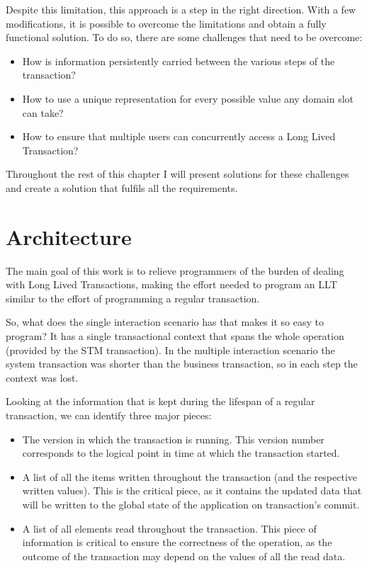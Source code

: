 Despite this limitation, this approach is a step in the right
direction. With a few modifications, it is possible to overcome the
limitations and obtain a fully functional solution. To do so, there
are some challenges that need to be overcome:

\begin{itemize}

\item How is information persistently carried between the various
  steps of the transaction?

\item How to use a unique representation for every possible value any
  domain slot can take?

\item How to ensure that multiple users can concurrently access a Long
  Lived Transaction?

\end{itemize}

Throughout the rest of this chapter I will present solutions for these
challenges and create a solution that fulfils all the requirements.

\section{Architecture}
\label{sec:arch}

The main goal of this work is to relieve programmers of the burden of
dealing with Long Lived Transactions, making the effort needed to
program an LLT similar to the effort of programming a regular
transaction.

So, what does the single interaction scenario has that makes it so
easy to program? It has a single transactional context that spans the
whole operation (provided by the STM transaction). In the multiple
interaction scenario the system transaction was shorter than the
business transaction, so in each step the context was lost.

Looking at the information that is kept during the lifespan of a
regular transaction, we can identify three major pieces:

\begin{itemize}
\item The version in which the transaction is running. This version
  number corresponds to the logical point in time at which the
  transaction started.
\item A list of all the items written throughout the transaction (and
  the respective written values). This is the critical piece, as it
  contains the updated data that will be written to the global state
  of the application on transaction's commit.
\item A list of all elements read throughout the transaction. This
  piece of information is critical to ensure the correctness of the
  operation, as the outcome of the transaction may depend on the
  values of all the read data.
\end{itemize}

